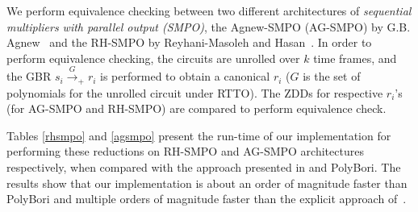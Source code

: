 \par We perform equivalence checking between two different
architectures of {\it sequential multipliers with parallel output
  (SMPO)}, the Agnew-SMPO (AG-SMPO) by
G.B. Agnew~\cite{agnew1991implementation} and the RH-SMPO by
Reyhani-Masoleh and Hasan~\cite{RHmulti}. 
In order to perform equivalence checking, the circuits are unrolled
over $k$ time frames, and the GBR $s_i \xrightarrow{G}_+ r_i$ 
is performed to obtain a canonical $r_i$ ($G$ is the set of
polynomials for the unrolled circuit under RTTO). The ZDDs for
respective $r_i$'s (for AG-SMPO and RH-SMPO) are compared to perform
equivalence check.    


Tables \ref{rhsmpo} and \ref{agsmpo} present the run-time of our
implementation for performing these reductions on RH-SMPO and AG-SMPO
architectures respectively, when compared with the approach presented
in \cite{pruss:tcad} and PolyBori. 
The results show that our implementation is about an order of
magnitude faster than PolyBori and multiple orders of magnitude faster
than the  explicit approach of~\cite{pruss:tcad}.

